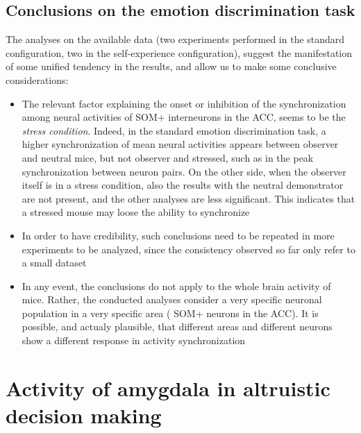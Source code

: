 \documentclass[12pt, a4paper]{article}
\begin{document}
\subsection{Conclusions on the emotion discrimination task}


The analyses on the available data (two experiments performed in the standard configuration, two in the self-experience configuration), suggest the manifestation of some unified tendency in the results, and allow us to make some conclusive considerations:

\begin{itemize}
	
	\item The relevant factor explaining the onset or inhibition of the synchronization among neural activities of SOM+ interneurons in the ACC, seems to be the \textit{stress condition}. Indeed, in the standard emotion discrimination task, a higher synchronization of mean neural activities appears between observer and neutral mice, but not observer and stressed, such as in the peak synchronization between neuron pairs. On the other side, when the observer itself is in a stress condition, also the results with the neutral demonstrator are not present, and the other analyses are less significant. This indicates that a stressed mouse may loose the ability to synchronize
	
	\item In order to have credibility, such conclusions need to be repeated in more experiments to be analyzed, since the consistency observed so far only refer to a small dataset
	
	\item In any event, the conclusions do not apply to the whole brain activity of mice. Rather, the conducted analyses consider a very specific neuronal population in a very specific area ( SOM+ neurons in the ACC). It is possible, and actualy plausible, that different areas and different neurons show a different response in activity synchronization
	
\end{itemize}





\newpage
\section{Activity of amygdala in altruistic decision making}
\end{document}
